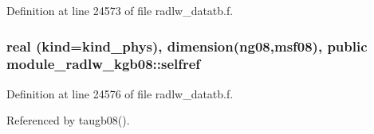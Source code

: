 Definition at line 24573 of file radlw\+\_\+datatb.\+f.

\subsubsection[{\texorpdfstring{selfref}{selfref}}]{\setlength{\rightskip}{0pt plus 5cm}real (kind=kind\+\_\+phys), dimension(ng08,{\bf msf08}), public module\+\_\+radlw\+\_\+kgb08\+::selfref}\hypertarget{namespacemodule__radlw__kgb08_a2c38561d26f86f7ae515b433843c4e5d}{}\label{namespacemodule__radlw__kgb08_a2c38561d26f86f7ae515b433843c4e5d}


Definition at line 24576 of file radlw\+\_\+datatb.\+f.



Referenced by taugb08().

